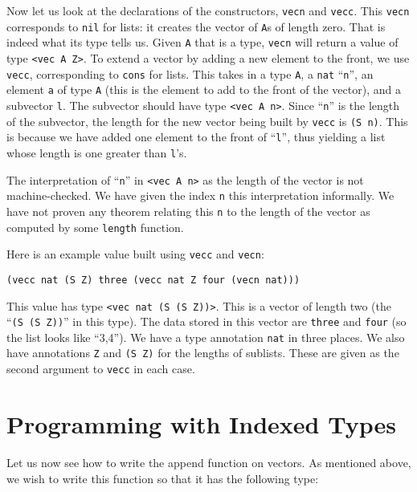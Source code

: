 \documentclass{book}[12pt]
\begin{document}
Now let us look at the declarations of the constructors, \texttt{vecn}
and \texttt{vecc}.  This \texttt{vecn} corresponds to \texttt{nil} for
lists: it creates the vector of \texttt{A}s of length zero.  That is
indeed what its type tells us.  Given \texttt{A} that is a type,
\texttt{vecn} will return a value of type \texttt{<vec A Z>}.  To
extend a vector by adding a new element to the front, we use
\texttt{vecc}, corresponding to \texttt{cons} for lists.  This takes
in a type \texttt{A}, a \texttt{nat} ``\texttt{n}'', an element
\texttt{a} of type \texttt{A} (this is the element to add to the front
of the vector), and a subvector \texttt{l}.  The subvector should have
type \texttt{<vec A n>}.  Since ``\texttt{n}'' is the length of the
subvector, the length for the new vector being built by \texttt{vecc}
is \texttt{(S n)}.  This is because we have added one element to the
front of ``\texttt{l}'', thus yielding a list whose length is one
greater than \texttt{l}'s.

The interpretation of ``\texttt{n}'' in \texttt{<vec A n>} as the
length of the vector is not machine-checked.  We have given the index
\texttt{n} this interpretation informally.  We have not proven any
theorem relating this \texttt{n} to the length of the vector as
computed by some \texttt{length} function.  

Here is an example value built using \texttt{vecc} and
\texttt{vecn}:

\begin{verbatim}
(vecc nat (S Z) three (vecc nat Z four (vecn nat)))
\end{verbatim}

\noindent This value has type \texttt{<vec nat (S (S Z))>}.  This is a
vector of length two (the ``\texttt{(S (S Z))}'' in this type).  The
data stored in this vector are \texttt{three} and \texttt{four} (so
the list looks like ``3,4'').  We have a type annotation \texttt{nat}
in three places.  We also have annotations \texttt{Z} and \texttt{(S
Z)} for the lengths of sublists.  These are given as the second
argument to \texttt{vecc} in each case.  

\section{Programming with Indexed Types}

Let us now see how to write the append function on vectors.  As mentioned above,
we wish to write this function so that it has the following type:
\end{document}
